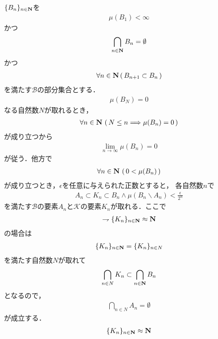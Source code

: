 		\begin{prf}
			$\{B_n\}_{n \in \mathbf{N}}$を
			\begin{align}
				\mu(B_1) < \infty
			\end{align}
			かつ
			\begin{align}
				\bigcap_{n \in \mathbf{N}} B_n = \emptyset
			\end{align}
			かつ
			\begin{align}
				\forall n \in \mathbf{N}\, (\, B_{n+1} \subset B_n\, )
			\end{align}
			を満たす$\mathcal{B}$の部分集合とする．
			\begin{align}
				\mu(B_N) = 0
			\end{align}
			なる自然数$N$が取れるとき，
			\begin{align}
				\forall n \in \mathbf{N}\, \left(\, N \leq n \Longrightarrow \mu(B_n) = 0\, \right)
			\end{align}
			が成り立つから
			\begin{align}
				\lim_{n \to \infty} \mu(B_n) = 0
			\end{align}
			が従う．他方で
			\begin{align}
				\forall n \in \mathbf{N}\, \left(\, 0 < \mu(B_n)\, \right)
			\end{align}
			が成り立つとき，$\epsilon$を任意に与えられた正数とすると，
			各自然数$n$で
			\begin{align}
				A_n \subset K_n \subset B_n \wedge \mu(B_n \backslash A_n) < \frac{\epsilon}{2^n}
			\end{align}
			を満たす$\mathcal{B}$の要素$A_n$と$\mathcal{K}$の要素$K_n$が取れる．ここで
			\begin{align}
				\rightharpoondown \{K_n\}_{n \in \mathbf{N}} \approx \mathbf{N}
				\label{thm_finite_intersection_property_and_common_point_property_1}
			\end{align}
			の場合は
			\begin{align}
				\{K_n\}_{n \in \mathbf{N}} = \{K_n\}_{n \in N}
			\end{align}
			を満たす自然数$N$が取れて
			\begin{align}
				\bigcap_{n \in N} K_n \subset \bigcap_{n\in\mathbf{N}} B_n
			\end{align}
			となるので，
			\begin{align}
				\bigcap_{n \in N} A_n = \emptyset
			\end{align}
			が成立する．
			\begin{align}
				\{K_n\}_{n \in \Natural} \eqp \Natural
				\label{thm_finite_intersection_property_and_common_point_property_2}

\end{align}
\end{prf}
